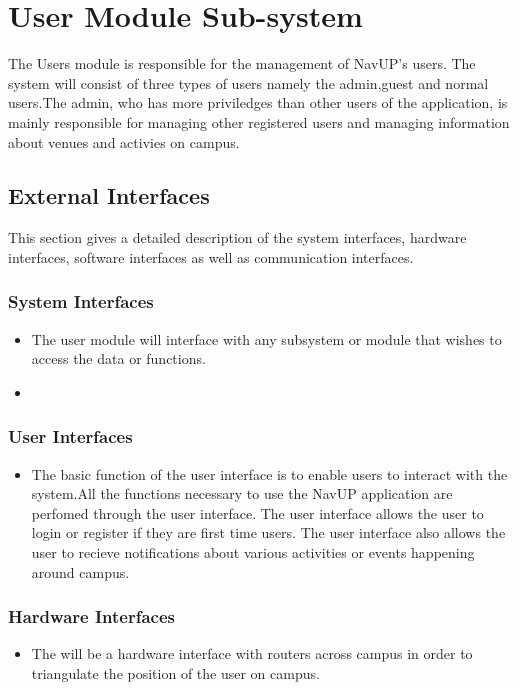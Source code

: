 

\section{User Module Sub-system}

The Users module is responsible for the management of NavUP's users. The system will consist of three types of users namely the admin,guest and normal users.The admin, who has more priviledges than other users of the application, is mainly responsible for managing other registered users and managing information about venues and activies on campus.

\subsection{External Interfaces}
This section gives a detailed description of the system interfaces, hardware interfaces, software interfaces as well as communication interfaces.

	\subsubsection{System Interfaces}
		\begin{itemize}
			\item The user module will interface with any subsystem or module that wishes to access the data or               functions.  
			
			\item 
		\end{itemize}
	\subsubsection{User Interfaces }
	\begin{itemize}
	\item The basic function of the user interface is to enable users to interact with the system.All the functions necessary to use the NavUP application are perfomed through the user interface. The user interface allows the user to login or register if they are first time users. The user interface also allows the user to recieve notifications about various activities or events happening around campus. 

	\end{itemize}
 
	\subsubsection{Hardware Interfaces }
	\begin{itemize}
	\item The will be a hardware interface with routers across campus in order to triangulate the position of the user on campus.
	\end{itemize}
